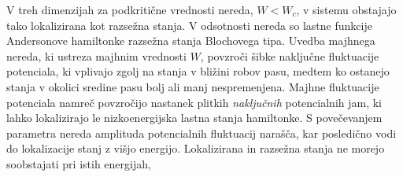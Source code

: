 \noindent 
\begin{minipage}[t]{0.56\textwidth} 

V treh dimenzijah za podkritične vrednosti nereda, $W<W_c$, v sistemu obstajajo tako lokalizirana kot razsežna stanja. V odsotnosti nereda so lastne funkcije Andersonove hamiltonke razsežna stanja Blochovega tipa. Uvedba majhnega nereda, ki ustreza majhnim vrednosti $W$, povzroči šibke naključne fluktuacije potenciala, ki vplivajo zgolj na stanja v bližini robov pasu, medtem ko ostanejo stanja v okolici sredine pasu bolj ali manj nespremenjena. Majhne fluktuacije potenciala namreč povzročijo nastanek plitkih \emph{naključnih} potencialnih jam, ki lahko lokalizirajo le nizkoenergijska lastna stanja hamiltonke. S povečevanjem parametra nereda amplituda potencialnih fluktuacij narašča, kar posledično vodi do lokalizacije stanj z višjo energijo. Lokalizirana in razsežna stanja ne morejo soobstajati pri istih energijah, 
\end{minipage}\hfill
